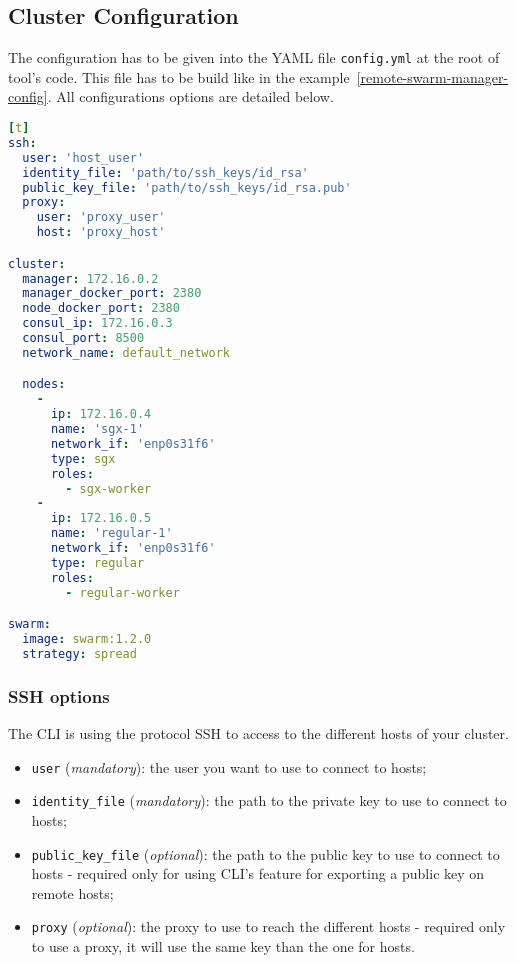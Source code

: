 
\subsection{Cluster Configuration}
\label{subsec:clustersetup:config}

The configuration has to be given into the YAML file \texttt{config.yml} at the root of tool's code.
This file has to be build like in the example~\ref{remote-swarm-manager-config}.
All configurations options are detailed below.

\begin{lstlisting}[language=YAML,caption={Configuration file example for configuring the \textsc{Docker Swarm} cluster using the CLI.},label=remote-swarm-manager-config][t]
ssh:
  user: 'host_user'
  identity_file: 'path/to/ssh_keys/id_rsa'
  public_key_file: 'path/to/ssh_keys/id_rsa.pub'
  proxy:
    user: 'proxy_user'
    host: 'proxy_host'

cluster:
  manager: 172.16.0.2
  manager_docker_port: 2380
  node_docker_port: 2380
  consul_ip: 172.16.0.3
  consul_port: 8500
  network_name: default_network

  nodes:
    -
      ip: 172.16.0.4
      name: 'sgx-1'
      network_if: 'enp0s31f6'
      type: sgx
      roles:
        - sgx-worker
    -
      ip: 172.16.0.5
      name: 'regular-1'
      network_if: 'enp0s31f6'
      type: regular
      roles:
        - regular-worker

swarm:
  image: swarm:1.2.0
  strategy: spread
\end{lstlisting}

\subsubsection{SSH options}

The CLI is using the protocol \textsc{SSH} to access to the different hosts of your cluster.

\begin{itemize}
  \item \texttt{user} (\emph{mandatory}): the user you want to use to connect to hosts;
  \item \texttt{identity\_file} (\emph{mandatory}): the path to the private key to use to connect to hosts;
  \item \texttt{public\_key\_file} (\emph{optional}): the path to the public key to use to connect to hosts - required only for using CLI's feature for exporting a public key on remote hosts;
  \item \texttt{proxy} (\emph{optional}): the proxy to use to reach the different hosts - required only to use a proxy, it will use the same key than the one for hosts.
\end{itemize}

